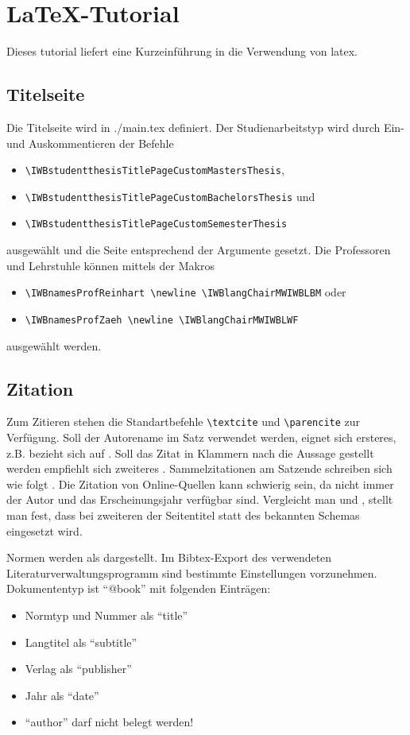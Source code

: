 \chapter{LaTeX-Tutorial}%
Dieses \gls{tutorial} liefert eine Kurzeinführung in die Verwendung von \gls{latex}.%
%
\section{Titelseite}%
Die Titelseite wird in {./main.tex} definiert. Der Studienarbeitstyp wird durch Ein- und Auskommentieren der Befehle%
\begin{itemize}%
	\item \verb|\IWBstudentthesisTitlePageCustomMastersThesis|,%
	\item \verb|\IWBstudentthesisTitlePageCustomBachelorsThesis| und%
	\item \verb|\IWBstudentthesisTitlePageCustomSemesterThesis|%
\end{itemize}%
ausgewählt und die Seite entsprechend der Argumente gesetzt. Die Professoren und Lehrstuhle können mittels der Makros%
\begin{itemize}%
	\item \verb|\IWBnamesProfReinhart \newline \IWBlangChairMWIWBLBM| oder%
	\item \verb|\IWBnamesProfZaeh \newline \IWBlangChairMWIWBLWF|%
\end{itemize}%
ausgewählt werden.%
%
\section{Zitation}%
%
Zum Zitieren stehen die Standartbefehle \verb|\textcite| und \verb|\parencite| zur Verfügung. Soll der Autorename im Satz verwendet werden, eignet sich ersteres, z.B. \textcite[2-3]{Bayerlein2018} bezieht sich auf \textcite{Bayerlein2016469}. Soll das Zitat in Klammern nach die Aussage gestellt werden empfiehlt sich zweiteres \parencite{Zaeh2018385}. Sammelzitationen am Satzende schreiben sich wie folgt \parencite{Kleinwort2018658,Kleinwort20189,Kleinwort2018631}. Die Zitation von Online-Quellen kann schwierig sein, da nicht immer der Autor und das Erscheinungsjahr verfügbar sind. Vergleicht man \textcite{Heuss2018} und \textcite{iwb-Startseite}, stellt man fest, dass bei zweiteren der Seitentitel statt des bekannten Schemas eingesetzt wird.\par%
%
Normen werden als dargestellt. Im Bibtex-Export des verwendeten Literaturverwaltungsprogramm sind bestimmte Einstellungen vorzunehmen. Dokumententyp ist \enquote{@book} mit folgenden Einträgen:
\begin{itemize}
	\item Normtyp und Nummer als \enquote{title}
	\item Langtitel als \enquote{subtitle}
	\item Verlag als \enquote{publisher}
	\item Jahr als \enquote{date}
	\item \enquote{author} darf nicht belegt werden!
\end{itemize}
%
